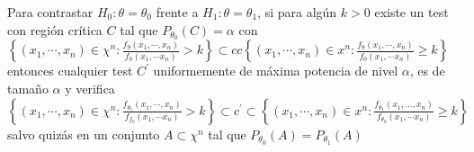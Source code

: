 \begin{teorema} 
Para contrastar $H_{0}: \theta=\theta_{0}$ frente a $H_{1}: \theta=\theta_{1}$, si para algún $k>0$ existe un test con región crítica $C$ tal que $P_{\theta_{0}}(C)=\alpha$ con $\left\{\left(x_{1}, \cdots, x_{n}\right) \in \chi^{n}: \frac{f_{9}\left(x_{1}, \cdots, x_{n}\right)}{f_{0}\left(x_{1}, \cdots x_{n}\right)}>k\right\} \subset c c\left\{\left(x_{1}, \cdots, x_{n}\right) \in x^{n}: \frac{f_{9}\left(x_{1}, \cdots, x_{n}\right)}{f_{0}\left(x_{1}, \cdots x_{n}\right)} \geq k\right\}$ entonces cualquier test $C^{\prime}$ uniformemente de máxima potencia de nivel $\alpha$, es de tamaño $\alpha$ y verifica\\
$\left\{\left(x_{1}, \cdots, x_{n}\right) \in \chi^{n}: \frac{f_{\theta_{1}}\left(x_{1}, \cdots, x_{n}\right)}{f_{f_{0}}\left(x_{1}, \cdots x_{n}\right)}>k\right\} \subset c^{\prime} \subset\left\{\left(x_{1}, \cdots, x_{n}\right) \in x^{n}: \frac{f_{\theta_{1}}\left(x_{1}, \ldots, x_{n}\right)}{f_{\theta_{0}}\left(x_{1}, \cdots x_{n}\right)} \geq k\right\}$ salvo quizás en un conjunto $A \subset \chi^{n}$ tal que $P_{\theta_{0}}(A)=P_{\theta_{1}}(A)$
\end{teorema}

